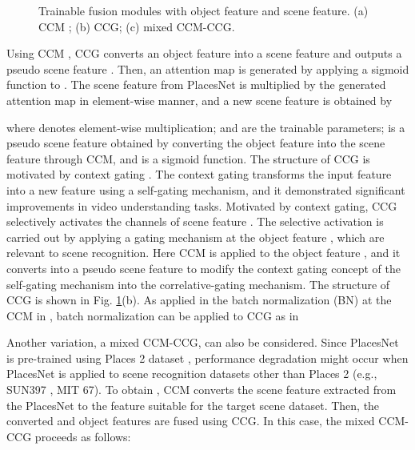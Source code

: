 \documentclass[journal,comsoc]{IEEEtran}
\begin{document}
\begin{figure}[!t]
\centering
{}


\caption{Trainable fusion modules with object feature and scene feature. (a) CCM \cite{b21}; (b) CCG; (c) mixed CCM-CCG.}
\label{fig7}
\end{figure}

Using CCM \cite{b21}, CCG converts an object feature into a scene feature and outputs a pseudo scene feature . Then, an attention map is generated by applying a sigmoid function to . The scene feature  from PlacesNet is multiplied by the generated attention map  in element-wise manner, and a new scene feature  is obtained by

where  denotes element-wise multiplication;  and  are the trainable parameters;  is a pseudo scene feature obtained by converting the object feature into the scene feature through CCM, and  is a sigmoid function.
The structure of CCG is motivated by context gating \cite{b22}. The context gating transforms the input feature into a new feature using a self-gating mechanism, and it demonstrated significant improvements in video understanding tasks. Motivated by context gating, CCG selectively activates the channels of scene feature . The selective activation is carried out by applying a gating mechanism at the object feature , which are relevant to scene recognition. Here CCM \cite{b21} is applied to the object feature , and it converts  into a pseudo scene feature  to modify the context gating concept of the self-gating mechanism into the correlative-gating mechanism. The structure of CCG is shown in Fig. \ref{fig7}(b). As applied in the batch normalization (BN) \cite{b32} at the CCM in \cite{b21}, batch normalization can be applied to CCG as in 


Another variation, a mixed CCM-CCG, can also be considered. Since PlacesNet is pre-trained using Places 2 dataset \cite{b20}, performance degradation might occur when PlacesNet is applied to scene recognition datasets other than Places 2 (e.g., SUN397 \cite{b33}, MIT 67\cite{b34}). To obtain , CCM converts the scene feature extracted from the PlacesNet to the feature suitable for the target scene dataset. Then, the converted  and object features are fused using CCG. In this case, the mixed CCM-CCG proceeds as follows:
\end{document}
